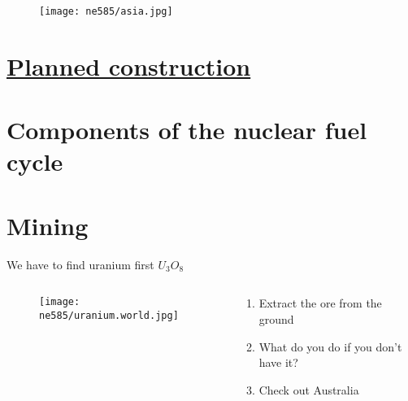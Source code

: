 \documentclass[aspectratio=1610,pdftex,dvipsnames,compress,xcolor={dvipsnames}]{beamer}
\begin{document}
\begin{frame}{}
    \begin{figure}
        \centering
        \texttt{[image: ne585/asia.jpg]}
    \end{figure}
\end{frame}


\section{\href{https://www.world-nuclear.org/information-library/current-and-future-generation/plans-for-new-reactors-worldwide.aspx}{Planned construction}}
\section{Components of the nuclear fuel cycle}
\section{Mining}


\addtocounter{framenumber}{-3} 
\begin{frame}{We have to find uranium first \href{https://www.uxc.com/p/prices/UxCPrices.aspx?currency=eur}{$U_3O_8$}}
    \begin{columns}[c]

        \begin{column}{0.55\textwidth}
            \begin{figure}
                \centering
                \texttt{[image: ne585/uranium.world.jpg]}
            \end{figure}
        \end{column}

        \begin{column}{0.45\textwidth}
            \begin{enumerate}[series=outerlist,topsep=0pt,itemsep=21pt,leftmargin=*,label=(\arabic*)]
                \item[]Extract the ore from the ground
                \item[]What do you do if you don't have it?
                \item[]Check out Australia
            \end{enumerate}
        \end{column}

    \end{columns}
\end{frame}
\end{document}
